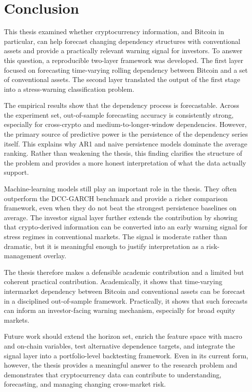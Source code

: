 ﻿\section{Conclusion}

This thesis examined whether cryptocurrency information, and Bitcoin in particular, can help forecast changing dependency structures with conventional assets and provide a practically relevant warning signal for investors. To answer this question, a reproducible two-layer framework was developed. The first layer focused on forecasting time-varying rolling dependency between Bitcoin and a set of conventional assets. The second layer translated the output of the first stage into a stress-warning classification problem.

The empirical results show that the dependency process is forecastable. Across the experiment set, out-of-sample forecasting accuracy is consistently strong, especially for cross-crypto and medium-to-longer-window dependencies. However, the primary source of predictive power is the persistence of the dependency series itself. This explains why AR1 and naive persistence models dominate the average ranking. Rather than weakening the thesis, this finding clarifies the structure of the problem and provides a more honest interpretation of what the data actually support.

Machine-learning models still play an important role in the thesis. They often outperform the DCC-GARCH benchmark and provide a richer comparison framework, even when they do not beat the strongest persistence baselines on average. The investor signal layer further extends the contribution by showing that crypto-derived information can be converted into an early warning signal for stress regimes in conventional markets. The signal is moderate rather than dramatic, but it is meaningful enough to justify interpretation as a risk-management overlay.

The thesis therefore makes a defensible academic contribution and a limited but coherent practical contribution. Academically, it shows that time-varying intermarket dependency between Bitcoin and conventional assets can be forecast in a disciplined out-of-sample framework. Practically, it shows that such forecasts can inform an investor-facing warning mechanism, especially for broad equity markets.

Future work should extend the horizon set, enrich the feature space with macro and on-chain variables, test alternative dependence targets, and integrate the signal layer into a portfolio-level backtesting framework. Even in its current form, however, the thesis provides a meaningful answer to the research problem and demonstrates that cryptocurrency data can contribute to understanding, forecasting, and managing changing cross-market risk.
